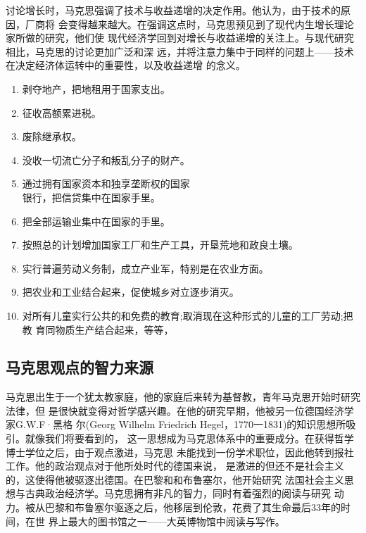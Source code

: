 讨论增长时，马克思强调了技术与收益递增的决定作用。他认为，由于技术的原因，厂商将
会变得越来越大。在强调这点时，马克思预见到了现代内生增长理论家所做的研究，他们使
现代经济学回到对增长与收益递增的关注上。与现代研究相比，马克思的讨论更加广泛和深
远，并将注意力集中于同样的问题上——技术在决定经济体运转中的重要性，以及收益递增
的念义。
\begin{tcolorbox}[title = {《共产党宣言》中的共产主义是什么样的},
  fonttitle = \sffamily\bfseries, fontupper = \small, fontlower =
  \small\itshape, left=20pt]
  \begin{multicols}{2}
    \begin{enumerate}
    \item 剥夺地产，把地租用于国家支出。
    \item 征收高额累进税。
    \item 废除继承权。
    \item 没收一切流亡分子和叛乱分子的财产。
    \item 通过拥有国家资本和独享垄断权的国家\\银行，把信贷集中在国家手里。
    \item 把全部运输业集中在国家的手里。
    \item 按照总的计划增加国家工厂和生产工具，开垦荒地和政良土壤。
    \item 实行普遍劳动义务制，成立产业军，特别是在农业方面。
    \item 把农业和工业结合起来，促使城乡对立逐步消灭。
    \item 对所有儿童实行公共的和免费的教育;取消现在这种形式的儿童的工厂劳动;把教
      育同物质生产结合起来，等等，
    \end{enumerate}
  \end{multicols}
\end{tcolorbox}


\subsection{马克思观点的智力来源}
马克思出生于一个犹太教家庭，他的家庭后来转为基督教，青年马克思开始时研究法律，但
是很快就变得对哲学感兴趣。在他的研究早期，他被另一位德国经济学家G.W.F·黑格
尔(Georg Wilhelm Friedrich Hegel，1770一1831)的知识思想所吸引。就像我们将要看到的，
这一思想成为马克思体系中的重要成分。在获得哲学博士学位之后，由于观点激进，马克思
未能找到一份学术职位，因此他转到报社工作。他的政治观点对于他所处时代的德国来说，
是激进的但还不是社会主义的，这使得他被驱逐出德国。在巴黎和和布鲁塞尔，他开始研究
法国社会主义思想与古典政治经济学。马克思拥有非凡的智力，同时有着强烈的阅读与研究
动力。被从巴黎和布鲁塞尔驱逐之后，他移居到伦敦，花费了其生命最后33年的时间，在世
界上最大的图书馆之一——大英博物馆中阅读与写作。

